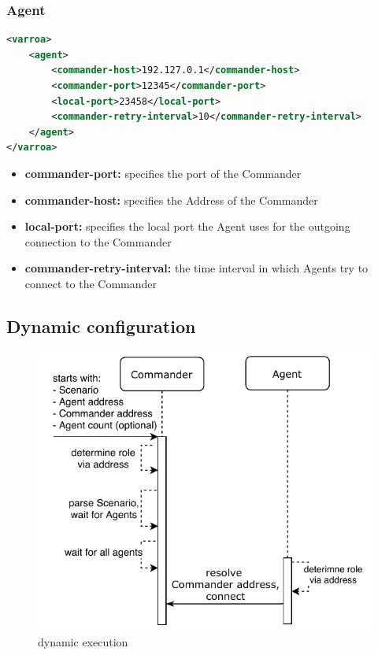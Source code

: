 \subsubsection{Agent}\label{sec:agentConfig}
\begin{lstlisting}[caption={Agent XML configuration example}, captionpos=b, label={lst:agentConfig}, language=XML]
<varroa>
    <agent>
		<commander-host>192.127.0.1</commander-host>
        <commander-port>12345</commander-port>
        <local-port>23458</local-port>
		<commander-retry-interval>10</commander-retry-interval>
    </agent>
</varroa>
\end{lstlisting}
\begin{itemize}
	\item \textbf{commander-port:} specifies the port of the Commander
	\item \textbf{commander-host:} specifies the Address of the Commander
	\item \textbf{local-port:} specifies the local port the Agent uses for the outgoing connection to the Commander %
	\item \textbf{commander-retry-interval:} the time interval in which Agents try to connect to the Commander
\end{itemize}

\subsection{Dynamic configuration}

\begin{figure}[h]
\begin{center}
\includegraphics[scale=1]{Resources/PDF/ExecutionDnsInit}
\caption{dynamic execution}
\label{pic:dynamicExecution}
\end{center}
\end{figure}

